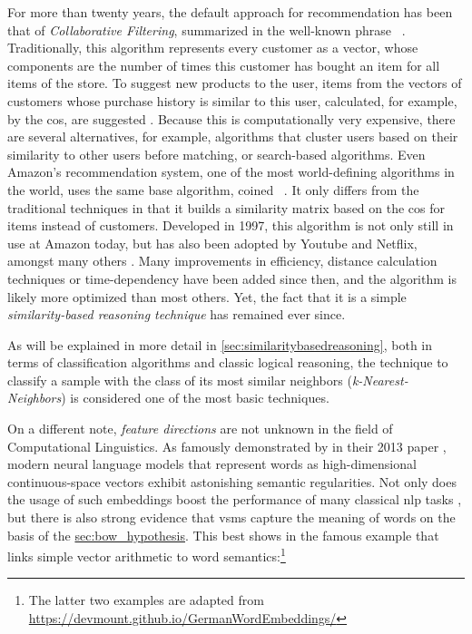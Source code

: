 For more than twenty years, the default approach for recommendation has been that of \emph{Collaborative Filtering}, summarized in the well-known phrase~  \cite{Sarwar2000}. Traditionally, this algorithm represents every customer as a vector, whose components are the number of times this customer has bought an item for all items of the store. To suggest new products to the user, items from the vectors of customers whose purchase history is similar to this user, calculated, for example, by the \gls{cos}, are suggested \cite{Linden2003}. Because this is computationally very expensive, there are several alternatives, for example, algorithms that cluster users based on their similarity to other users before matching, or search-based algorithms. Even Amazon's recommendation system, one of the most world-defining algorithms in the world, uses the same base algorithm, coined~ . It only differs from the traditional techniques in that it builds a similarity matrix based on the \gls{cos} for items instead of customers. Developed in 1997, this algorithm is not only still in use at Amazon today, but has also been adopted by Youtube and Netflix, amongst many others \cite{Smith2017}. Many improvements in efficiency, distance calculation techniques or time-dependency have been added since then, and the algorithm is likely more optimized than most others. Yet, the fact that it is a simple \textit{similarity-based reasoning technique} has remained ever since. 

As will be explained in more detail in \autoref{sec:similaritybasedreasoning}, both in terms of classification algorithms and classic logical reasoning, the technique to classify a sample with the class of its most similar neighbors (\emph{k-Nearest-Neighbors}) is considered one of the most basic techniques.

On a different note, \textit{feature directions} are not unknown in the field of Computational Linguistics. As famously demonstrated by \textcite{Mikolov:Regularities} in their 2013 paper , modern neural language models that represent words as high-dimensional continuous-space vectors exhibit astonishing semantic regularities. Not only does the usage of such embeddings boost the performance of many classical \gls{nlp} tasks \cite{Mikolov2013a,Le2014, Devlin2019}, but there is also strong evidence that \glspl{vsm} capture the meaning of words on the basis of the \hyperref[distributional hypothesis]{sec:bow_hypothesis}. This best shows in the famous example that links simple vector arithmetic to word semantics:\footnote{The latter two examples are adapted from \url{https://devmount.github.io/GermanWordEmbeddings/}}

